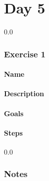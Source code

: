 \part{Day 5}

{\setlength{\baselineskip}%
  {0.0\baselineskip}
  \section*{\flushright Exercise 1}
  \hrulefill \par}
\subsection{Name}

\subsection{Description}

\subsection{Goals}

\subsection{Steps}

\newpage
  {\setlength{\baselineskip}%
           {0.0\baselineskip}
  \section*{Notes}
  \hrulefill \par}